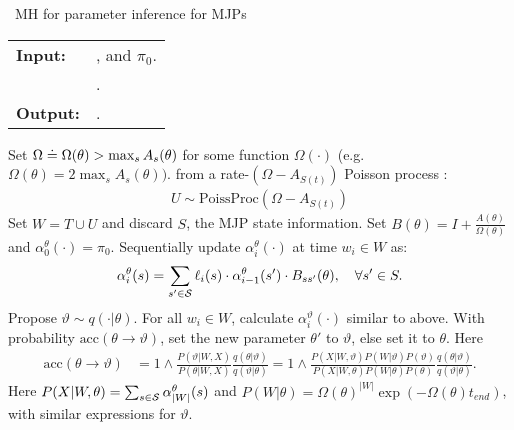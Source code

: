 \begin{algorithm}[H]
   \caption{\Naive\  MH for parameter inference for MJPs }
   \label{alg:MH_naive}
  \begin{tabular}{l l}
   \textbf{Input:  } & \text{Observations $X$}, 
                       \text{the MJP path $S(t) = (S, T)$, the  parameters $\theta$ }and $\pi_0$.\\ 
                     & \text{A  Metropolis-Hasting proposal $q(\cdot | \theta)$}.\\
   \textbf{Output:  }& \text{A new MJP trajectory $S'(t) = (S', T')$, 
                            new MJP parameters $\theta'$}.\\
   \hline
   \end{tabular}
   \begin{algorithmic}[1]
     \State Set $\Omega \doteq \Omega(\theta) > \max_s{A_s(\theta)}$ for
     some function $\Omega(\cdot)$ (e.g.\ $\Omega(\theta) = 
      2\max_s A_s(\theta))$.
       from a rate-$(\Omega-A_{S(t)})$ Poisson process : 
\begin{align*}
  U \sim \text{PoissProc}(\Omega - A_{S(t)}) 
\end{align*}
      \State 
    Set $W = T \cup U$ and discard $S$, the MJP state information.
    \State 
    Set $B(\theta) = I + \frac{A(\theta)}{\Omega(\theta)}$ and
    $\alpha^\theta_0(\cdot) = \pi_0$.
    Sequentially update $\alpha^\theta_i(\cdot)$ at time $w_i \in W$ as: 
    $$\alpha^{\theta}_i(s) = \sum_{s' \in {\mathcal S}} \ell_i(s) \cdot \alpha^{\theta}_{i-1}(s')\cdot B_{ss'}(\theta), \quad \forall s' \in S. $$
      \State Propose $\vartheta \sim q(\cdot| \theta)$.
      For all $w_i \in W$, calculate $\alpha^\vartheta_i(\cdot)$ similar to above.
      \State With probability $\text{acc}(\theta\rightarrow\vartheta)$, set the new parameter $\theta'$ to $\vartheta$, else set it to $\theta$. Here 
          \begin{align*}
            \text{acc}(\theta \rightarrow \vartheta) &=  1 \wedge \frac{P(\vartheta|W, X)}{P(\theta|W, X)} \frac{q(\theta|\vartheta)}{q(\vartheta|\theta)}
          =  1 \wedge \frac{P(X| W,\vartheta) P(W | \vartheta)P(\vartheta)}
            {P(X|W, \theta)P(W | \theta)P(\theta)} \frac{q(\theta|\vartheta)}{q(\vartheta|\theta)}.
          \end{align*}
          Here $P(X|W,\theta) = \sum_{s \in {\mathcal S}} \alpha_{|W|}^\theta(s) $ and $P(W|\theta) = \Omega(\theta)^{|W|}\exp(-\Omega(\theta)t_{end})$, with similar expressions for $\vartheta$. 

\end{algorithmic}
\end{algorithm}
